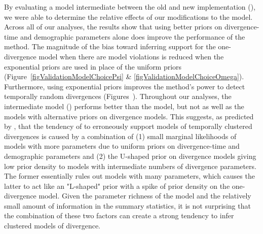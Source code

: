 By evaluating a model intermediate between the old and new implementation
(\modelUshaped), we were able to determine the relative effects of our
modifications to the model.
Across all of our analyses, the results show that using better priors on
divergence-time and demographic parameters alone does improve the performance
of the method.
The magnitude of the bias toward inferring support for the one-divergence
model when there are model violations is reduced when the exponential
priors are used in place of the uniform priors
(Figure~\ref{figValidationModelChoicePsi} \&
\ref{figValidationModelChoiceOmega}).
Furthermore, using exponential priors improves the method's power to detect
temporally random divergences
(Figures~).
Throughout our analyses, the intermediate model (\modelUshaped) performs better
than the \msb model, but not as well as the models with alternative priors on
divergence models.
This suggests, as predicted by \citet{Oaks2012}, that the tendency of \msb to
erroneously support models of temporally clustered divergences is caused by a
combination of
(1) small marginal likelihoods of models with more \divTime{} parameters due to
uniform priors on divergence-time and demographic parameters and
(2) the U-shaped prior on divergence models giving low prior density to models
with intermediate numbers of divergence parameters.
The former essentially rules out models with many \divTime{} parameters, which
causes the latter to act like an "L-shaped" prior with a spike of
prior density on the one-divergence model.
Given the parameter richness of the model and the relatively small amount of
information in the summary statistics, it is not surprising that the
combination of these two factors can create a strong tendency to infer
clustered models of divergence.

